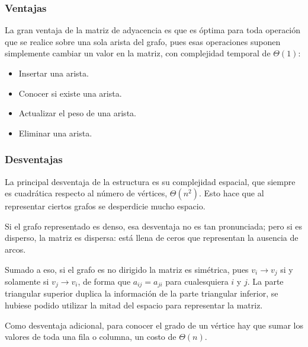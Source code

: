 \subsubsection{Ventajas}
\label{sec:ventajas}

La gran ventaja de la matriz de adyacencia es que es óptima para toda operación que se realice sobre una sola arista del grafo, pues esas operaciones suponen simplemente cambiar un valor en la matriz, con complejidad temporal de \(\Theta(1)\):
\begin{itemize}
  \item Insertar una arista.
  \item Conocer si existe una arista.
  \item Actualizar el peso de una arista.
  \item Eliminar una arista.
\end{itemize}

\subsubsection{Desventajas}
\label{sec:desventajas}

La principal desventaja de la estructura es su complejidad espacial, que siempre es cuadrática respecto al número de vértices, \(\Theta (n^2)\). Esto hace que al representar ciertos grafos se desperdicie mucho espacio.

Si el grafo representado es denso, esa desventaja no es tan pronunciada; pero si es disperso, la matriz es dispersa: está llena de ceros que representan la ausencia de arcos.

Sumado a eso, si el grafo es no dirigido la matriz es simétrica, pues \(v_i \longrightarrow v_j\) si y solamente si \(v_j \longrightarrow v_i\), de forma que \(a_{ij} = a_{ji}\) para cualesquiera \(i\) y \(j\). La parte triangular superior duplica la información de la parte triangular inferior, se hubiese podido utilizar la mitad del espacio para representar la matriz.

Como desventaja adicional, para conocer el grado de un vértice hay que sumar los valores de toda una fila o columna, un costo de \(\Theta(n)\).

